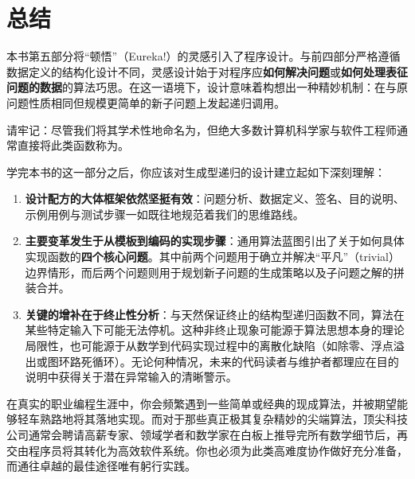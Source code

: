 
\chapter{总结}
\label{sec:ch30_summary}

本书第五部分将“顿悟”（Eureka!）的灵感引入了程序设计。与前四部分严格遵循数据定义的结构化设计不同，灵感设计始于对程序应\textbf{如何解决问题}或\textbf{如何处理表征问题的数据}的算法巧思。在这一语境下，设计意味着构想出一种精妙机制：在与原问题性质相同但规模更简单的新子问题上发起递归调用。

请牢记：尽管我们将其学术性地命名为，但绝大多数计算机科学家与软件工程师通常直接将此类函数称为。

学完本书的这一部分之后，你应该对生成型递归的设计建立起如下深刻理解：

\begin{enumerate}
  \item \textbf{设计配方的大体框架依然坚挺有效}：问题分析、数据定义、签名、目的说明、示例用例与测试步骤一如既往地规范着我们的思维路线。
  \item \textbf{主要变革发生于从模板到编码的实现步骤}：通用算法蓝图引出了关于如何具体实现函数的\textbf{四个核心问题}。其中前两个问题用于确立并解决“平凡”（trivial）边界情形，而后两个问题则用于规划新子问题的生成策略以及子问题之解的拼装合并。
  \item \textbf{关键的增补在于终止性分析}：与天然保证终止的结构型递归函数不同，算法在某些特定输入下可能无法停机。这种非终止现象可能源于算法思想本身的理论局限性，也可能源于从数学到代码实现过程中的离散化缺陷（如除零、浮点溢出或图环路死循环）。无论何种情况，未来的代码读者与维护者都理应在目的说明中获得关于潜在异常输入的清晰警示。
\end{enumerate}

在真实的职业编程生涯中，你会频繁遇到一些简单或经典的现成算法，并被期望能够轻车熟路地将其落地实现。而对于那些真正极其复杂精妙的尖端算法，顶尖科技公司通常会聘请高薪专家、领域学者和数学家在白板上推导完所有数学细节后，再交由程序员将其转化为高效软件系统。你也必须为此类高难度协作做好充分准备，而通往卓越的最佳途径唯有躬行实践。
